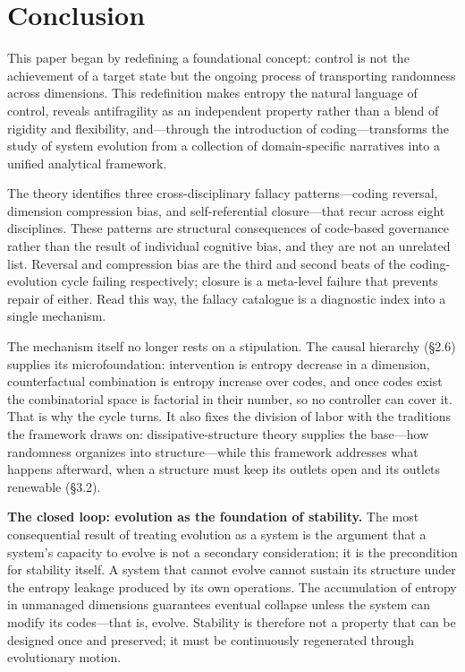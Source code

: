 \documentclass[11pt,a4paper]{article}
\begin{document}
\section{Conclusion}

This paper began by redefining a foundational concept: control is not the achievement of a target state but the ongoing process of transporting randomness across dimensions. This redefinition makes entropy the natural language of control, reveals antifragility as an independent property rather than a blend of rigidity and flexibility, and---through the introduction of coding---transforms the study of system evolution from a collection of domain-specific narratives into a unified analytical framework.

The theory identifies three cross-disciplinary fallacy patterns---coding reversal, dimension compression bias, and self-referential closure---that recur across eight disciplines. These patterns are structural consequences of code-based governance rather than the result of individual cognitive bias, and they are not an unrelated list. Reversal and compression bias are the third and second beats of the coding-evolution cycle failing respectively; closure is a meta-level failure that prevents repair of either. Read this way, the fallacy catalogue is a diagnostic index into a single mechanism.

The mechanism itself no longer rests on a stipulation. The causal hierarchy (\S2.6) supplies its microfoundation: intervention is entropy decrease in a dimension, counterfactual combination is entropy increase over codes, and once codes exist the combinatorial space is factorial in their number, so no controller can cover it. That is why the cycle turns. It also fixes the division of labor with the traditions the framework draws on: dissipative-structure theory supplies the base---how randomness organizes into structure---while this framework addresses what happens afterward, when a structure must keep its outlets open and its outlets renewable (\S3.2).

\textbf{The closed loop: evolution as the foundation of stability.} The most consequential result of treating evolution as a system is the argument that a system's capacity to evolve is not a secondary consideration; it is the precondition for stability itself. A system that cannot evolve cannot sustain its structure under the entropy leakage produced by its own operations. The accumulation of entropy in unmanaged dimensions guarantees eventual collapse unless the system can modify its codes---that is, evolve. Stability is therefore not a property that can be designed once and preserved; it must be continuously regenerated through evolutionary motion.
\end{document}
